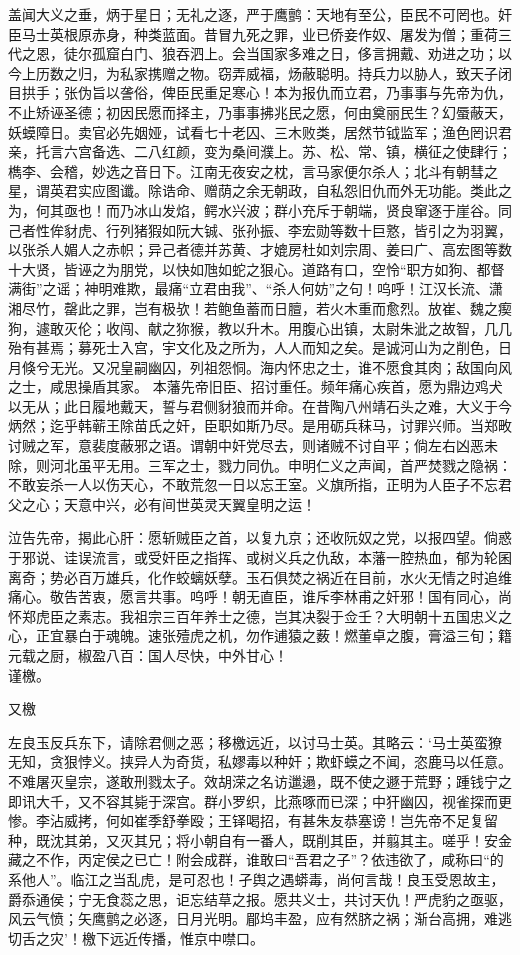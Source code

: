 \documentclass[]{article}
\begin{document}
盖闻大义之垂，炳于星日；无礼之逐，严于鹰鹯：天地有至公，臣民不可罔也。奸臣马士英根原赤身，种类蓝面。昔冒九死之罪，业已侨妾作奴、屠发为僧；重荷三代之恩，徒尔孤窟白门、狼吞泗上。会当国家多难之日，侈言拥戴、劝进之功；以今上历数之归，为私家携赠之物。窃弄威福，炀蔽聪明。持兵力以胁人，致天子闭目拱手；张伪旨以詟俗，俾臣民重足寒心！本为报仇而立君，乃事事与先帝为仇，不止矫诬圣德；初因民愿而择主，乃事事拂兆民之愿，何由奠丽民生？幻蜃蔽天，妖蟆障日。卖官必先姻娅，试看七十老囚、三木败类，居然节钺监军；渔色罔识君亲，托言六宫备选、二八红颜，变为桑间濮上。苏、松、常、镇，横征之使肆行；檇李、会稽，妙选之音日下。江南无夜安之枕，言马家便尔杀人；北斗有朝彗之星，谓英君实应图谶。除诰命、赠荫之余无朝政，自私怨旧仇而外无功能。类此之为，何其亟也！而乃冰山发焰，鳄水兴波；群小充斥于朝端，贤良窜逐于崖谷。同己者性侔豺虎、行列猪猳如阮大铖、张孙振、李宏勋等数十巨憝，皆引之为羽翼，以张杀人媚人之赤帜；异己者德并苏黄、才媲房杜如刘宗周、姜曰广、高宏图等数十大贤，皆诬之为朋党，以快如虺如蛇之狠心。道路有口，空怜``职方如狗、都督满街''之谣；神明难欺，最痛``立君由我''、``杀人何妨''之句！呜呼！江汉长流、潇湘尽竹，罄此之罪，岂有极欤！若鲍鱼蓄而日膻，若火木重而愈烈。放崔、魏之瘈狗，遽敢灭伦；收闯、献之狝猴，教以升木。用腹心出镇，太尉朱泚之故智，几几殆有甚焉；募死士入宫，宇文化及之所为，人人而知之矣。是诚河山为之削色，日月倏兮无光。又况皇嗣幽囚，列祖怨恫。海内怀忠之士，谁不愿食其肉；敌国向风之士，咸思操盾其家。
本藩先帝旧臣、招讨重任。频年痛心疾首，愿为鼎边鸡犬以无从；此日履地戴天，誓与君侧豺狼而并命。在昔陶八州靖石头之难，大义于今炳然；迄乎韩蕲王除苗氏之奸，臣职如斯乃尽。是用砺兵秣马，讨罪兴师。当郑畋讨贼之军，意裴度蔽邪之语。谓朝中奸党尽去，则诸贼不讨自平；倘左右凶恶未除，则河北虽平无用。三军之士，戮力同仇。申明仁义之声闻，首严焚戮之隐祸：不敢妄杀一人以伤天心，不敢荒忽一日以忘王室。义旗所指，正明为人臣子不忘君父之心；天意中兴，必有间世英灵天翼皇明之运！

泣告先帝，揭此心肝：愿斩贼臣之首，以复九京；还收阮奴之党，以报四望。倘惑于邪说、诖误流言，或受奸臣之指挥、或树义兵之仇敌，本藩一腔热血，郁为轮囷离奇；势必百万雄兵，化作蛟螭妖孽。玉石俱焚之祸近在目前，水火无情之时追维痛心。敬告苦衷，愿言共事。呜呼！朝无直臣，谁斥李林甫之奸邪！国有同心，尚怀郑虎臣之素志。我祖宗三百年养士之德，岂其决裂于佥壬？大明朝十五国忠义之心，正宜暴白于魂魄。速张殪虎之机，勿作逋猿之薮！燃董卓之腹，膏溢三旬；籍元载之厨，椒盈八百：国人尽快，中外甘心！\\
谨檄。

又檄

左良玉反兵东下，请除君侧之恶；移檄远近，以讨马士英。其略云：`马士英蛮獠无知，贪狠悖义。挟异人为奇货，私嫪毒以种奸；欺虾蟆之不闻，恣鹿马以任意。不难屠灭皇宗，遂敢刑戮太子。效胡溁之名访邋遢，既不使之遯于荒野；踵钱宁之即讯大千，又不容其毙于深宫。群小罗织，比燕啄而已深；中犴幽囚，视雀探而更惨。李沾威拷，何如崔季舒拳殴；王铎喝招，有甚朱友恭塞谤！岂先帝不足复留种，既沈其弟，又灭其兄；将小朝自有一番人，既削其臣，并翦其主。嗟乎！安金藏之不作，丙定侯之已亡！附会成群，谁敢曰``吾君之子''？依违欲了，咸称曰``的系他人''。临江之当乱虎，是可忍也！孑舆之遇蟒毒，尚何言哉！良玉受恩故主，爵忝通侯；宁无食蕊之思，讵忘结草之报。愿共义士，共讨天仇！严虎豹之亟驱，风云气愤；矢鹰鹯之必逐，日月光明。郿坞丰盈，应有然脐之祸；渐台高拥，难逃切舌之灾'！檄下远近传播，惟京中噤口。
\end{document}
